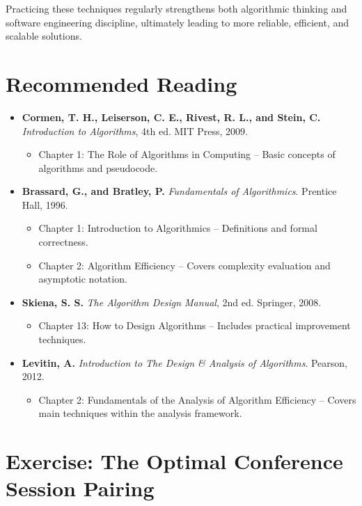 \documentclass[12pt]{article}
\begin{document}
Practicing these techniques regularly strengthens both algorithmic thinking and software engineering discipline, ultimately leading to more reliable, efficient, and scalable solutions.


\section{Recommended Reading}
\begin{itemize}
\item \textbf{Cormen, T. H., Leiserson, C. E., Rivest, R. L., and Stein, C.}
\textit{Introduction to Algorithms}, 4th ed. MIT Press, 2009.
\begin{itemize}
\item Chapter 1: The Role of Algorithms in Computing – Basic concepts of algorithms and pseudocode.
\end{itemize}
\item \textbf{Brassard, G., and Bratley, P.}
\textit{Fundamentals of Algorithmics}. Prentice Hall, 1996.
\begin{itemize}
    \item Chapter 1: Introduction to Algorithmics – Definitions and formal correctness.
    \item Chapter 2: Algorithm Efficiency – Covers complexity evaluation and asymptotic notation.
\end{itemize}

\item \textbf{Skiena, S. S.}
\textit{The Algorithm Design Manual}, 2nd ed. Springer, 2008.
\begin{itemize}
    \item Chapter 13: How to Design Algorithms – Includes practical improvement techniques.
\end{itemize}

\item \textbf{Levitin, A.}
\textit{Introduction to The Design \& Analysis of Algorithms}. Pearson, 2012.
\begin{itemize}
    \item Chapter 2: Fundamentals of the Analysis
of Algorithm Efficiency – Covers main techniques within the analysis framework.
\end{itemize}
\end{itemize}

\section{Exercise: The Optimal Conference Session Pairing}
\end{document}
